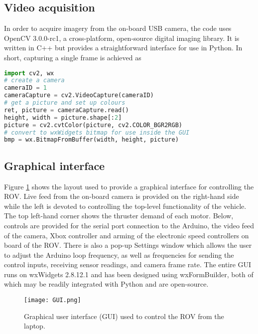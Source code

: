\subsection{Video acquisition}

In order to acquire imagery from the on-board USB camera, the code uses OpenCV 3.0.0-rc1,
a cross-platform, open-source digital imaging library. It is written in C++ but
provides a straightforward interface for use in Python.
In short, capturing a single frame is achieved as

\begin{lstlisting}[style=myPythonStyle,language=Python]
import cv2, wx
# create a camera
cameraID = 1
cameraCapture = cv2.VideoCapture(cameraID)
# get a picture and set up colours
ret, picture = cameraCapture.read()
height, width = picture.shape[:2]
picture = cv2.cvtColor(picture, cv2.COLOR_BGR2RGB)
# convert to wxWidgets bitmap for use inside the GUI
bmp = wx.BitmapFromBuffer(width, height, picture)
\end{lstlisting}

\subsection{Graphical interface}

Figure \ref{fig:GUI} shows the layout used to provide a graphical interface for
controlling the ROV. Live feed from the on-board camera is provided on the right-hand
side while the left is devoted to controlling the top-level functionality of the
vehicle. The top left-hand corner shows the thruster demand of each motor. Below,
controls are provided for the serial port connection to the Arduino, the video
feed of the camera, Xbox controller and arming of the electronic speed controllers
on board of the ROV.
There is also a pop-up Settings window which allows the user to adjust the
Arduino loop frequency, as well as frequencies for sending the control inputs,
receiving sensor readings, and camera frame rate.
The entire GUI runs on wxWidgets 2.8.12.1 and has been designed using wxFormBuilder,
both of which may be readily integrated with Python and are open-source.

\begin{figure}[]
\begin{center}
\texttt{[image: GUI.png]}
\end{center}
\caption{Graphical user interface (GUI) used to control the ROV from the laptop.}
\label{fig:GUI}
\end{figure}
